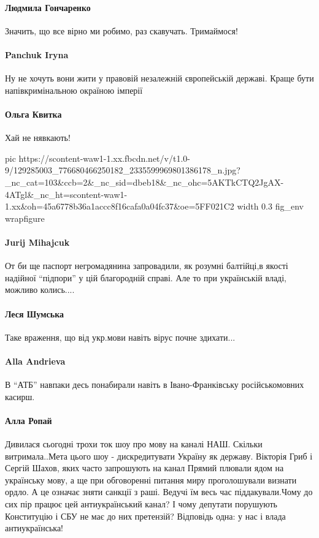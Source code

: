 \paragraph{Людмила Гончаренко}
Значить, що все вірно ми робимо, раз скавучать. Тримаймося!

\paragraph{Panchuk Iryna}

Ну не хочуть вони жити у правовій незалежній європейській державі. Краще бути
напівкримінальною окраїною імперії

\paragraph{Ольга Квитка}
Хай не нявкають!

\ifcmt
pic https://scontent-waw1-1.xx.fbcdn.net/v/t1.0-9/129285003_776680466250182_2335599969801386178_n.jpg?_nc_cat=103&ccb=2&_nc_sid=dbeb18&_nc_ohc=5AKTkCTQ2JgAX-4ATgl&_nc_ht=scontent-waw1-1.xx&oh=45a6778b36a1accc8f16cafa0a04fc37&oe=5FF021C2
width 0.3
fig_env wrapfigure
\fi

\paragraph{Jurij Mihajcuk}

От би ще паспорт негромадянина запровадили, як розумні балтійці,в якості
надійної \enquote{підпори} у цій благородній справі.  Але то при українській
владі, можливо колись....

\paragraph{Леся Шумська}

Таке враження, що від укр.мови навіть вірус почне здихати...

\paragraph{Alla Andrieva}

В \enquote{АТБ} навпаки десь понабирали навіть в Івано-Франківську російськомовних касирш.

\paragraph{Алла Ропай}

Дивилася сьогодні трохи ток шоу про мову на каналі НАШ. Скільки витримала..Мета
цього шоу - дискредитувати Україну як державу. Вікторія Гриб і Сергій Шахов,
яких часто запрошують на канал Прямий плювали ядом на українську мову, а ще при
обговоренні питання миру проголошували визнати ордло. А це означає зняти
санкції з раші. Ведучі їм весь час піддакували.Чому до сих пір працює цей
антиукраїнський канал? І чому депутати порушують Конституцію і СБУ не має до
них претензій? Відповідь одна: у нас і влада антиукраїнська!

